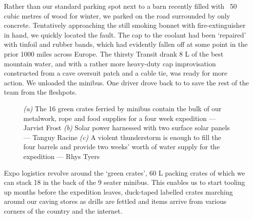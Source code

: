 Rather than our standard parking spot next to a barn recently filled with ~50 cubic metres of wood for winter, we parked on the road surrounded by only concrete. Tentatively approaching the still smoking bonnet with fire-extinguisher in hand, we quickly located the fault. The cap to the coolant had been `repaired' with tinfoil and rubber bands, which had evidently fallen off at some point in the prior 1000 miles across Europe. The thirsty Transit drank 8 L of the best mountain water, and with a rather more heavy-duty cap improvisation constructed from a cave oversuit patch and a cable tie, was ready for more action. We unloaded the minibus. One driver drove back to  to save the rest of the team from the fleshpots. 

\begin{figure}[t!]
\checkoddpage \ifoddpage \forcerectofloat \else \forceversofloat \fi
\centering
    \begin{subfigure}[t]{0.413\textwidth}
        \centering
        \caption{} \label{ben with crates}
    \end{subfigure}
        \hfill
\begin{subfigure}[t]{0.577\textwidth}
\centering
{}
 \caption{}\label{solar panels}
\end{subfigure}
\vfill
\begin{subfigure}[t]{\textwidth}
\centering
{}
 \caption{}\label{full barrel}
\end{subfigure}
  \caption{
    \emph{(a)} The 16 green crates ferried by minibus contain the bulk of our metalwork, rope and food supplies for a four week expedition --- Jarvist Frost
     \emph{(b)}  Solar power harnessed with two surface solar panels --- Tanguy Racine
     \emph{(c)}  A violent thunderstorm is enough to fill the four barrels and provide two weeks' worth of water supply for the expedition ---  Rhys Tyers}
\end{figure}


Expo logistics revolve around the `green crates', 60 L packing crates of which we can stack 18 in the back of the 9 seater minibus. This enables us to start tooling up months before the expedition leaves, duck-taped labelled crates marching around our caving stores as drills are fettled and items arrive from various corners of the country and the internet. 

